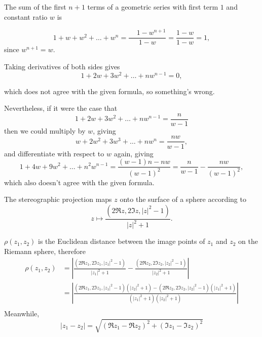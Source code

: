 \documentclass[12pt]{article}
\begin{document}
\begin{description}

  The sum of the first $n+1$ terms of a geometric series with first term $1$ and
  constant ratio $w$ is

  $$
  1 + w + w^2 + \ldots + w^{n} = \frac{~~~~~1 - w^{n+1}}{1 - w} = \frac{1 - w}{1 - w} = 1,
  $$
  since $w^{n+1} = w$.

  Taking derivatives of both sides gives
  $$
  1 + 2w + 3w^2 + \ldots + nw^{n-1} = 0,
  $$

  which does not agree with the given formula, so something's wrong.

  Nevertheless, if it were the case that
  $$
  1 + 2w + 3w^2 + \ldots + nw^{n-1} = \frac{n}{w -1}
  $$
  then we could multiply by $w$, giving
  $$
  w + 2w^2 + 3w^3 + \ldots + nw^n = \frac{nw}{w -1},
  $$
  and differentiate with respect to $w$ again, giving
  $$
  1 + 4w + 9w^2 + \ldots + n^2w^{n-1} = \frac{(w-1)n - nw}{(w - 1)^2} = \frac{n}{w - 1} - \frac{nw}{(w - 1)^2},
  $$
  which also doesn't agree with the given formula.




  The stereographic projection maps $z$ onto the surface of a sphere according to
  $$
  z \mapsto \frac{(2 \Re z, 2 \Im z, |z|^2 - 1)}{|z|^2 + 1}.
  $$


  $\rho(z_1, z_2)$
  is the Euclidean distance between the image points of $z_1$ and $z_2$ on the
  Riemann sphere, therefore
  \begin{align*}
  \rho(z_1, z_2)
  &=
  \left|
  \frac{(2 \Re z_1, 2 \Im z_1, |z_1|^2 - 1)}{|z_1|^2 + 1} -
  \frac{(2 \Re z_2, 2 \Im z_2, |z_2|^2 - 1)}{|z_2|^2 + 1}
  \right| \\
  &=
  \left|
  \frac{
  (2 \Re z_1, 2 \Im z_1, |z_1|^2 - 1)(|z_2|^2 + 1) -
  (2 \Re z_2, 2 \Im z_2, |z_2|^2 - 1)(|z_1|^2 + 1)
  }
  {(|z_1|^2 + 1)(|z_2|^2 + 1)}
  \right| \\
  \end{align*}
  Meanwhile,
  $$
  |z_1 - z_2| = \sqrt{(\Re z_1 - \Re z_2)^2 + (\Im z_1 - \Im z_2)^2}
  $$


\end{description}
\end{document}
